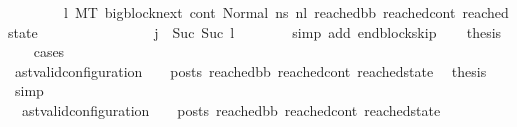 \begin{isabellebody}
\ \ \ \ \ \ \ {\isacharparenleft}{\kern0pt}{\isasymexists}\ l{}{\isachardot}{\kern0pt}\ {\isacharparenleft}{\kern0pt}M{\isacharcomma}{\kern0pt}{\isasymLambda}{\isacharcomma}{\kern0pt}{\isasymGamma}{\isacharcomma}{\kern0pt}{\isasymOmega}{\isacharcomma}{\kern0pt}T\ {\isasymturnstile}{\isacharparenleft}{\kern0pt}bigblock{\isacharunderscore}{\kern0pt}next{\isacharcomma}{\kern0pt}\ cont{}{\isacharcomma}{\kern0pt}\ Normal\ ns{}{\isacharprime}{\kern0pt}{\isacharprime}{\kern0pt}{\isacharparenright}{\kern0pt}\ {\isacharminus}{\kern0pt}n{\isasymlongrightarrow}{\isacharcircum}{\kern0pt}l{}\ {\isacharparenleft}{\kern0pt}reached{\isacharunderscore}{\kern0pt}bb{\isacharcomma}{\kern0pt}\ reached{\isacharunderscore}{\kern0pt}cont{\isacharcomma}{\kern0pt}\ reached{\isacharunderscore}{\kern0pt}state{\isacharparenright}{\kern0pt}{\isacharparenright}{\kern0pt}\ {\isasymand}\ \isanewline
\ \ \ \ \ \ \ \ \ \ \ \ \ \ {\isacharparenleft}{\kern0pt}j{\isacharprime}{\kern0pt}\ {\isacharequal}{\kern0pt}\ Suc\ {\isacharparenleft}{\kern0pt}Suc\ l{}{\isacharparenright}{\kern0pt}{\isacharparenright}{\kern0pt}\ {\isacharparenright}{\kern0pt}{\isachardoublequoteclose}\ \isanewline
\ \ \ \ \isamarkupfalse%
\ {\isacharparenleft}{\kern0pt}simp\ add{\isacharcolon}{\kern0pt}\ endblock{\isacharunderscore}{\kern0pt}skip{}{\isacharparenright}{\kern0pt}\isanewline
\ \ \isamarkupfalse%
\ {\isacharquery}{\kern0pt}thesis\isanewline
\ \ \isamarkupfalse%
\ cases\isanewline
\ \ \ \ \isamarkupfalse%
\ {\isachardoublequoteopen}{\isacharparenleft}{\kern0pt}ast{\isacharunderscore}{\kern0pt}valid{\isacharunderscore}{\kern0pt}configuration\ {\isasymLambda}\ {\isasymGamma}\ {\isasymOmega}\ posts\ reached{\isacharunderscore}{\kern0pt}bb\ reached{\isacharunderscore}{\kern0pt}cont\ reached{\isacharunderscore}{\kern0pt}state{\isacharparenright}{\kern0pt}{\isachardoublequoteclose}\ \isamarkupfalse%
\ {\isacharquery}{\kern0pt}thesis\ \isamarkupfalse%
\ simp\isanewline
\ \ \isamarkupfalse%
\ \isanewline
\ \ \ \ \isamarkupfalse%
\ {\isachardoublequoteopen}{\isasymnot}\ {\isacharparenleft}{\kern0pt}{\isacharparenleft}{\kern0pt}ast{\isacharunderscore}{\kern0pt}valid{\isacharunderscore}{\kern0pt}configuration\ {\isasymLambda}\ {\isasymGamma}\ {\isasymOmega}\ posts\ reached{\isacharunderscore}{\kern0pt}bb\ reached{\isacharunderscore}{\kern0pt}cont\ reached{\isacharunderscore}{\kern0pt}state{\isacharparenright}{\kern0pt}{\isacharparenright}{\kern0pt}{\isachardoublequoteclose}\isanewline

\end{isabellebody}
